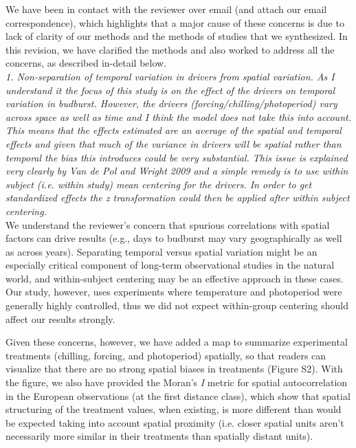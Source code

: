 \documentclass{article}
\begin{document}
We have been in contact with the reviewer over email (and attach our email correspondence), which highlights that a major cause of these concerns is due to lack of clarity of our methods and the methods of studies that we synthesized. In this revision, we have clarified the methods and also worked to address all the concerns, as described in-detail below.\\

\emph{1. Non-separation of temporal variation in drivers from spatial variation. As I understand it the
focus of this study is on the effect of the drivers on temporal variation in budburst. However,
the drivers (forcing/chilling/photoperiod) vary across space as well as time and I think the
model does not take this into account. This means that the effects estimated are an average of
the spatial and temporal effects and given that much of the variance in drivers will be spatial
rather than temporal the bias this introduces could be very substantial. This issue is explained
very clearly by Van de Pol and Wright 2009 and a simple remedy is to use within subject (i.e.
within study) mean centering for the drivers. In order to get standardized effects the z
transformation could then be applied after within subject centering.}\\

We understand the reviewer's concern that spurious correlations with spatial factors can drive results (e.g., days to budburst may vary geographically as well as across years). Separating temporal versus spatial variation might be an especially critical component of long-term observational studies in the natural world, and within-subject centering may be an effective approach in these cases. Our study, however, uses experiments where temperature and photoperiod were generally highly controlled, thus we did not expect within-group centering should affect our results strongly. 

Given these concerns, however, we have added a map to summarize experimental treatments (chilling, forcing, and photoperiod) spatially, so that readers can visualize that there are no strong spatial biases in treatments (Figure S2). With the figure, we also have provided the Moran's \emph{I} metric for spatial autocorrelation in the European observations (at the first distance class), which show that spatial structuring of the treatment values, when existing, is more different than would be expected taking into account spatial proximity (i.e. closer spatial units aren't necessarily more similar in their treatments than spatially distant units). 
\end{document}
